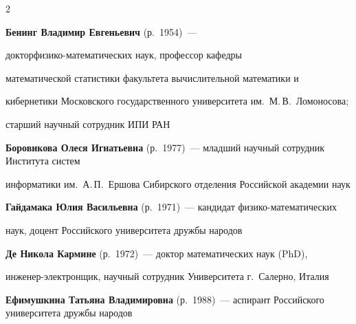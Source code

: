 \begin{multicols}{2}








\noindent

\textbf{Бенинг Владимир Евгеньевич} (р.\ 1954)~--- 

доктор\linebreak фи\-зи\-ко-ма\-те\-ма\-ти\-че\-ских наук, профессор кафедры 

математической статистики факультета вычислительной математики и 

кибернетики Московского государственного университета им.\ М.\,В.~Ломоносова; 

старший научный сотрудник ИПИ РАН



\vspace*{4pt}



\noindent

\textbf{Боровикова Олеся Игнатьевна} (р.\ 1977)~--- младший научный сотрудник Института систем 

информатики им.\ А.\,П.~Ершова Сибирского отделения Российской академии наук



\vspace*{4pt}



\noindent

\textbf{Гайдамака Юлия Васильевна} (р.\ 1971)~--- кандидат фи\-зи\-ко-ма\-те\-ма\-ти\-че\-ских 

наук, доцент  Российского университета дружбы народов



\vspace*{4pt}



\noindent

\textbf{Де Никола Кармине} (р.\ 1972)~--- доктор математических наук (PhD), 

ин\-же\-нер-электронщик, научный сотрудник Университета г.\ Салерно, Италия



\vspace*{4pt}



\noindent

\textbf{Ефимушкина Татьяна Владимировна} (р.\ 1988)~--- аспирант Российского университета дружбы народов




\end{multicols}
